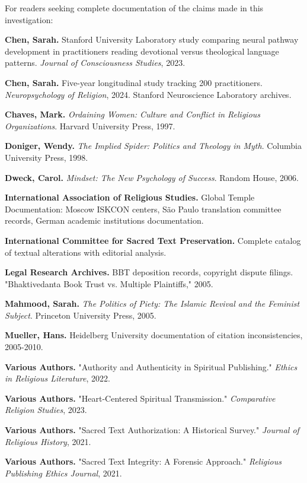 \documentclass[11pt,twoside]{book}
\begin{document}
For readers seeking complete documentation of the claims made in this investigation:

\textbf{\textbf{Chen, Sarah.}} Stanford University Laboratory study comparing neural pathway development in practitioners reading devotional versus theological language patterns. \emph{Journal of Consciousness Studies}, 2023.

\textbf{\textbf{Chen, Sarah.}} Five-year longitudinal study tracking 200 practitioners. \emph{Neuropsychology of Religion}, 2024. Stanford Neuroscience Laboratory archives.

\textbf{\textbf{Chaves, Mark.}} \emph{Ordaining Women: Culture and Conflict in Religious Organizations}. Harvard University Press, 1997.

\textbf{\textbf{Doniger, Wendy.}} \emph{The Implied Spider: Politics and Theology in Myth}. Columbia University Press, 1998.

\textbf{\textbf{Dweck, Carol.}} \emph{Mindset: The New Psychology of Success}. Random House, 2006.

\textbf{\textbf{International Association of Religious Studies.}} Global Temple Documentation: Moscow ISKCON centers, São Paulo translation committee records, German academic institutions documentation.

\textbf{\textbf{International Committee for Sacred Text Preservation.}} Complete catalog of textual alterations with editorial analysis.

\textbf{\textbf{Legal Research Archives.}} BBT deposition records, copyright dispute filings. "Bhaktivedanta Book Trust vs. Multiple Plaintiffs," 2005.

\textbf{\textbf{Mahmood, Sarah.}} \emph{The Politics of Piety: The Islamic Revival and the Feminist Subject}. Princeton University Press, 2005.

\textbf{\textbf{Mueller, Hans.}} Heidelberg University documentation of citation inconsistencies, 2005-2010.

\textbf{\textbf{Various Authors.}} "Authority and Authenticity in Spiritual Publishing." \emph{Ethics in Religious Literature}, 2022.

\textbf{\textbf{Various Authors.}} "Heart-Centered Spiritual Transmission." \emph{Comparative Religion Studies}, 2023.

\textbf{\textbf{Various Authors.}} "Sacred Text Authorization: A Historical Survey." \emph{Journal of Religious History}, 2021.

\textbf{\textbf{Various Authors.}} "Sacred Text Integrity: A Forensic Approach." \emph{Religious Publishing Ethics Journal}, 2021.
\end{document}
